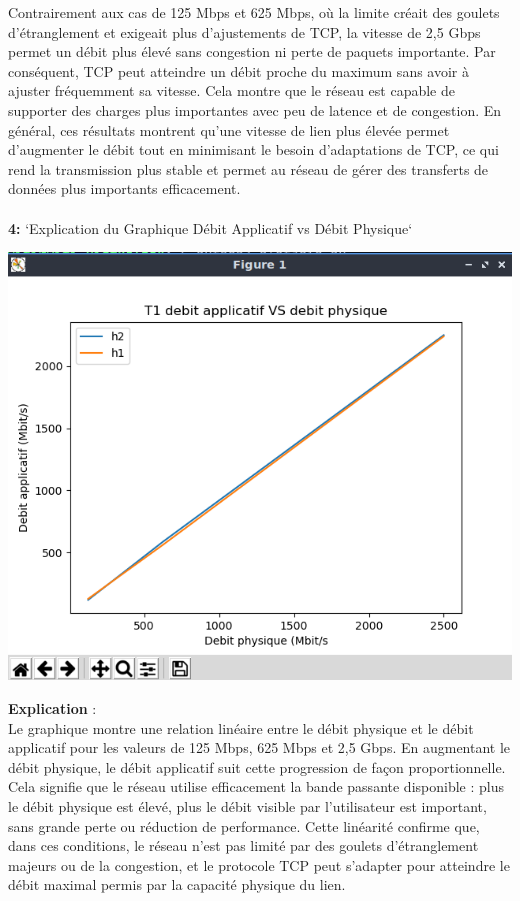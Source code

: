 Contrairement aux cas de 125 Mbps et 625 Mbps, où la limite créait des goulets d’étranglement et exigeait plus d’ajustements de TCP, la vitesse de 2,5 Gbps permet un débit plus élevé sans congestion ni perte de paquets importante. Par conséquent, TCP peut atteindre un débit proche du maximum sans avoir à ajuster fréquemment sa vitesse. Cela montre que le réseau est capable de supporter des charges plus importantes avec peu de latence et de congestion. En général, ces résultats montrent qu’une vitesse de lien plus élevée permet d’augmenter le débit tout en minimisant le besoin d’adaptations de TCP, ce qui rend la transmission plus stable et permet au réseau de gérer des transferts de données plus importants efficacement.
\\
\\
\textbf{4:} `Explication du Graphique Débit Applicatif vs Débit Physique`
\begin{center}
    \includegraphics[width=1\textwidth]{./images/T1.1/T1appVSphy.png}
\end{center}
\textbf{Explication} :\\
Le graphique montre une relation linéaire entre le débit physique et le débit applicatif pour les valeurs de 125 Mbps, 625 Mbps et 2,5 Gbps. En augmentant le débit physique, le débit applicatif suit cette progression de façon proportionnelle. Cela signifie que le réseau utilise efficacement la bande passante disponible : plus le débit physique est élevé, plus le débit visible par l’utilisateur est important, sans grande perte ou réduction de performance. Cette linéarité confirme que, dans ces conditions, le réseau n’est pas limité par des goulets d'étranglement majeurs ou de la congestion, et le protocole TCP peut s’adapter pour atteindre le débit maximal permis par la capacité physique du lien.

